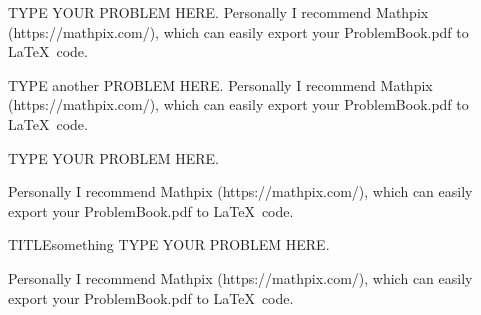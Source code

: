 \documentclass{yourmommaaintgotno}
\begin{document}

\begin{problem}{TYPE YOUR PROBLEM HERE.}
Personally I recommend Mathpix (https://mathpix.com/),
which can easily export your ProblemBook.pdf to \LaTeX \ code.
\end{problem}

\begin{problem}{TYPE another PROBLEM HERE.}
Personally I recommend Mathpix (https://mathpix.com/),
which can easily export your ProblemBook.pdf to \LaTeX \ code.
\end{problem}

\begin{Exercise}
  TYPE YOUR PROBLEM HERE.
\end{Exercise}
\begin{Solution}
Personally I recommend Mathpix (https://mathpix.com/),
which can easily export your ProblemBook.pdf to \LaTeX \ code.
\end{Solution}

\begin{exercise}{TITLE}{something}
  TYPE YOUR PROBLEM HERE.
\end{exercise}
\begin{solution}
Personally I recommend Mathpix (https://mathpix.com/),
which can easily export your ProblemBook.pdf to \LaTeX \ code.
\end{solution}

\end{document}
